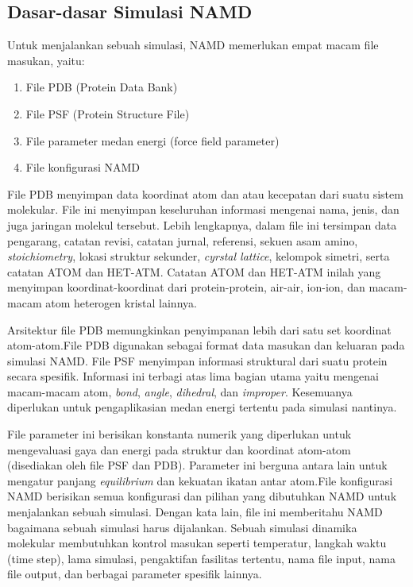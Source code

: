 \documentclass[aps,showpacs,pre,floatfix]{revtex4}
\begin{document}
\subsection{Dasar-dasar Simulasi NAMD}
Untuk menjalankan sebuah simulasi, NAMD memerlukan empat macam
file masukan, yaitu:

\begin{enumerate}
    \item {\footnotesize File PDB (Protein Data Bank)}
    \item {\footnotesize File PSF (Protein Structure File)}
    \item {\footnotesize File parameter medan energi (force field parameter) }
    \item {\footnotesize File konfigurasi NAMD}
\end{enumerate}

File PDB menyimpan data koordinat atom dan atau kecepatan dari
suatu sistem molekular.  File ini menyimpan keseluruhan informasi
mengenai nama, jenis, dan juga jaringan molekul tersebut. Lebih
lengkapnya, dalam file ini tersimpan data pengarang, catatan
revisi, catatan jurnal, referensi, sekuen asam amino,
\textit{stoichiometry}, lokasi struktur sekunder, \textit{cyrstal
lattice}, kelompok simetri, serta catatan ATOM dan HET-ATM.
Catatan ATOM dan HET-ATM inilah yang menyimpan koordinat-koordinat
dari protein-protein, air-air, ion-ion, dan macam-macam atom
heterogen kristal lainnya.

Arsitektur file PDB memungkinkan penyimpanan lebih dari satu set
koordinat atom-atom.File PDB digunakan sebagai format data masukan
dan keluaran pada simulasi NAMD.  File PSF menyimpan informasi
struktural dari suatu protein secara spesifik. Informasi ini
terbagi atas lima bagian utama yaitu mengenai macam-macam
atom,\hspace{15pt} \textit{bond}, \textit{angle},
\textit{dihedral}, dan \textit{improper}. Kesemuanya diperlukan
untuk pengaplikasian medan energi tertentu pada simulasi nantinya.

File parameter ini berisikan konstanta numerik yang diperlukan
untuk mengevaluasi gaya dan energi pada struktur dan koordinat
atom-atom (disediakan oleh file PSF dan PDB). Parameter ini
berguna antara lain untuk mengatur panjang \textit{equilibrium}
dan kekuatan ikatan antar atom.File konfigurasi NAMD berisikan
semua konfigurasi dan pilihan yang dibutuhkan NAMD untuk
menjalankan sebuah simulasi. Dengan kata lain, file ini
memberitahu NAMD bagaimana sebuah simulasi harus dijalankan.
Sebuah simulasi dinamika molekular membutuhkan kontrol masukan
seperti temperatur, langkah waktu (time step), lama simulasi,
pengaktifan fasilitas tertentu, nama file input, nama file output,
dan berbagai parameter spesifik lainnya.
\end{document}
